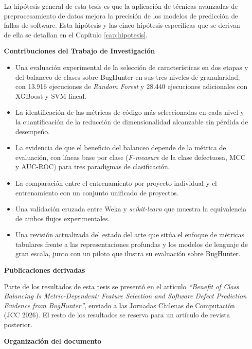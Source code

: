 La hipótesis general de esta tesis es que la aplicación de técnicas avanzadas de preprocesamiento de datos mejora la precisión de los modelos de predicción de fallas de software. Esta hipótesis y las cinco hipótesis específicas que se derivan de ella se detallan en el Capítulo \ref{cap:hipotesis}.

\textbf{Contribuciones del Trabajo de Investigación}

\begin{itemize}
    \item Una evaluación experimental de la selección de características en dos etapas y del balanceo de clases sobre BugHunter en sus tres niveles de granularidad, con 13.916 ejecuciones de \textit{Random Forest} y 28.440 ejecuciones adicionales con XGBoost y SVM lineal.
    \item La identificación de las métricas de código más seleccionadas en cada nivel y la cuantificación de la reducción de dimensionalidad alcanzable sin pérdida de desempeño.
    \item La evidencia de que el beneficio del balanceo depende de la métrica de evaluación, con líneas base por clase (\textit{F-measure} de la clase defectuosa, MCC y AUC-ROC) para tres paradigmas de clasificación.
    \item La comparación entre el entrenamiento por proyecto individual y el entrenamiento con un conjunto unificado de proyectos.
    \item Una validación cruzada entre Weka y \textit{scikit-learn} que muestra la equivalencia de ambos flujos experimentales.
    \item Una revisión actualizada del estado del arte que sitúa el enfoque de métricas tabulares frente a las representaciones profundas y los modelos de lenguaje de gran escala, junto con un piloto que ilustra su evaluación sobre BugHunter.
\end{itemize}

\textbf{Publicaciones derivadas}

Parte de los resultados de esta tesis se presentó en el artículo \textit{``Benefit of Class Balancing Is Metric-Dependent: Feature Selection and Software Defect Prediction Evidence from BugHunter''}, enviado a las Jornadas Chilenas de Computación (JCC 2026). El resto de los resultados se reserva para un artículo de revista posterior.

\textbf{Organización del documento}

